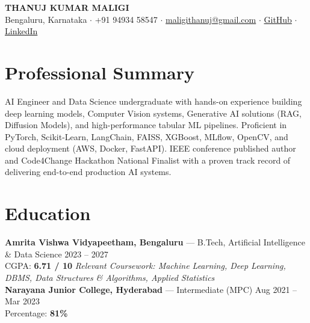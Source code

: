 \documentclass[a4paper,10pt]{article}
\begin{document}

\begin{center}
{\LARGE \textbf{THANUJ KUMAR MALIGI}}\\[1pt]
Bengaluru, Karnataka $\cdot$ +91 94934 58547 $\cdot$ \href{mailto:maligithanuj@gmail.com}{maligithanuj@gmail.com} $\cdot$ \href{https://github.com/ThanujMaligi}{GitHub} $\cdot$ \href{https://www.linkedin.com/in/thanuj-kumar-maligi-8882b2288}{LinkedIn}
\end{center}


\section*{Professional Summary}
AI Engineer and Data Science undergraduate with hands-on experience building deep learning models, Computer Vision systems, Generative AI solutions (RAG, Diffusion Models), and high-performance tabular ML pipelines. Proficient in PyTorch, Scikit-Learn, LangChain, FAISS, XGBoost, MLflow, OpenCV, and cloud deployment (AWS, Docker, FastAPI). IEEE conference published author and Code4Change Hackathon National Finalist with a proven track record of delivering end-to-end production AI systems.


\section*{Education}
\textbf{Amrita Vishwa Vidyapeetham, Bengaluru} --- B.Tech, Artificial Intelligence \& Data Science \hfill 2023 -- 2027\\
CGPA: \textbf{6.71 / 10} \hfill \textit{Relevant Coursework: Machine Learning, Deep Learning, DBMS, Data Structures \& Algorithms, Applied Statistics}\\
\textbf{Narayana Junior College, Hyderabad} --- Intermediate (MPC) \hfill Aug 2021 -- Mar 2023\\
Percentage: \textbf{81\%}

\end{document}
